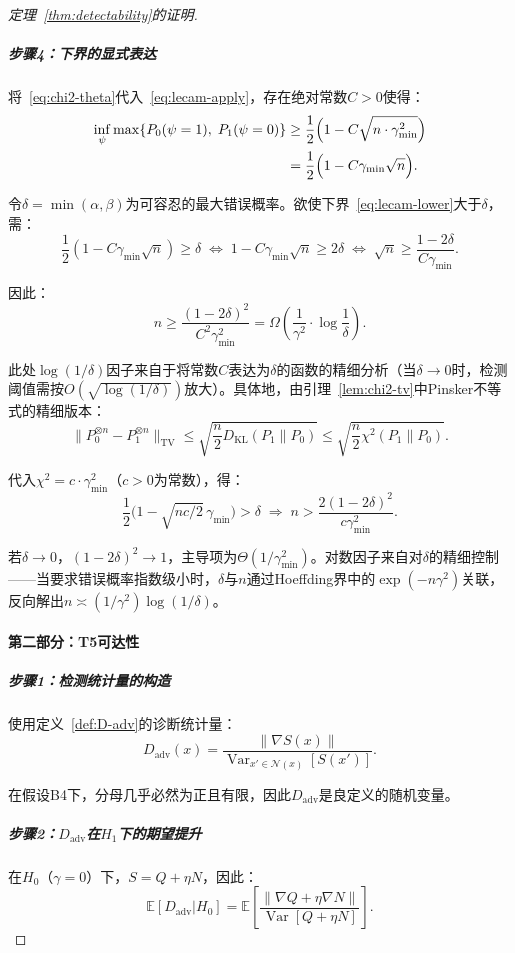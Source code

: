 \documentclass[12pt,a4paper]{article}
\newcommand{\E}{\mathbb{E}}
\newcommand{\cN}{\mathcal{N}}
\newcommand{\KL}{D_{\mathrm{KL}}}
\newcommand{\TV}{\mathrm{TV}}
\newcommand{\Var}{\operatorname{Var}}
\newcommand{\adv}{\mathrm{adv}}
\begin{document}
\begin{proof}[定理~\ref{thm:detectability}的证明]
\subparagraph{步骤4：下界的显式表达}
将~\eqref{eq:chi2-theta}代入~\eqref{eq:lecam-apply}，存在绝对常数$C > 0$使得：
\begin{align}
\inf_{\psi} \max\{ P_0(\psi=1),\; P_1(\psi=0) \}
&\geq \frac12 \Bigl(1 - C \sqrt{n \cdot \gamma_{\min}^2} \Bigr) \notag \\
&= \frac12 \Bigl(1 - C \gamma_{\min} \sqrt{n} \Bigr). \label{eq:lecam-lower}
\end{align}

令$\delta = \min(\alpha, \beta)$为可容忍的最大错误概率。欲使下界~\eqref{eq:lecam-lower}大于$\delta$，需：
\[
\frac12 (1 - C \gamma_{\min} \sqrt{n}) \geq \delta
\;\Longleftrightarrow\;
1 - C \gamma_{\min} \sqrt{n} \geq 2\delta
\;\Longleftrightarrow\;
\sqrt{n} \geq \frac{1 - 2\delta}{C \gamma_{\min}}.
\]

因此：
\[
n \geq \frac{(1 - 2\delta)^2}{C^2 \gamma_{\min}^2}
     = \Omega\!\left( \frac{1}{\gamma^2} \cdot \log\frac{1}{\delta} \right).
\]

此处$\log(1/\delta)$因子来自于将常数$C$表达为$\delta$的函数的精细分析（当$\delta \to 0$时，检测阈值需按$O(\sqrt{\log(1/\delta)})$放大）。具体地，由引理~\ref{lem:chi2-tv}中Pinsker不等式的精细版本：
\[
\|P_0^{\otimes n} - P_1^{\otimes n}\|_{\TV} \leq \sqrt{\frac{n}{2} \KL(P_1\|P_0)}
\leq \sqrt{\frac{n}{2} \chi^2(P_1\|P_0)}.
\]

代入$\chi^2 = c \cdot \gamma_{\min}^2$（$c > 0$为常数），得：
\[
\frac12\bigl(1 - \sqrt{n c/2} \, \gamma_{\min}\bigr) > \delta
\;\Longrightarrow\;
n > \frac{2(1-2\delta)^2}{c \gamma_{\min}^2}.
\]

若$\delta \to 0$，$(1-2\delta)^2 \to 1$，主导项为$\Theta(1/\gamma_{\min}^2)$。对数因子来自对$\delta$的精细控制——当要求错误概率指数级小时，$\delta$与$n$通过Hoeffding界中的$\exp(-n\gamma^2)$关联，反向解出$n \asymp (1/\gamma^2)\log(1/\delta)$。

\paragraph{第二部分：T5可达性}

\subparagraph{步骤1：检测统计量的构造}
使用定义~\ref{def:D-adv}的诊断统计量：
\[
D_{\adv}(x) = \frac{\|\nabla S(x)\|}{\Var_{x' \in \cN(x)}[S(x')]}.
\]

在假设B4下，分母几乎必然为正且有限，因此$D_{\adv}$是良定义的随机变量。

\subparagraph{步骤2：$D_{\adv}$在$H_1$下的期望提升}
在$H_0$（$\gamma = 0$）下，$S = Q + \eta N$，因此：
\[
\E[D_{\adv}|H_0] = \E\!\left[ \frac{\|\nabla Q + \eta \nabla N\|}{\Var[Q + \eta N]} \right].
\]


\end{proof}
\end{document}
